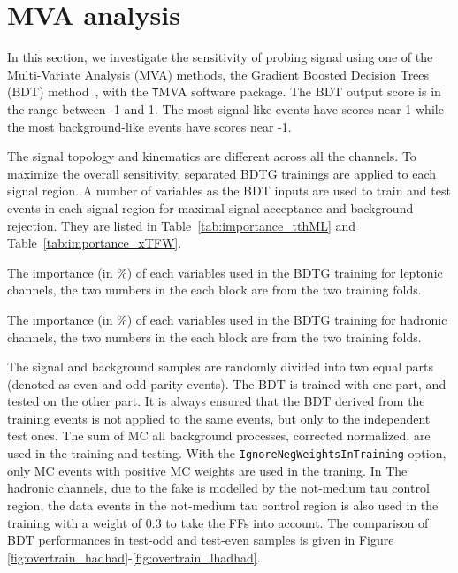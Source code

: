 \section{MVA analysis}
\label{sec:mva}

In this section, we investigate the sensitivity of probing signal using one of the Multi-Variate Analysis (MVA) methods, the Gradient Boosted Decision Trees (BDT) method~\cite{BDT,BDT2}, with the {\texttt TMVA} software package. The BDT output score is in the range between -1 and 1. The most signal-like events have scores near 1 while the most background-like events have scores near -1.

The signal topology and kinematics are different across all the channels. To maximize the overall sensitivity, separated BDTG trainings are applied to each signal region. A number of variables as the BDT inputs are used to train and test events in each signal region for maximal signal acceptance and background rejection. They are listed in Table~\ref{tab:importance_tthML} and Table~\ref{tab:importance_xTFW}. 

\begin{table}
\caption{The importance (in \%) of each variables used in the BDTG training for leptonic channels, the two numbers in the each block are from the two training folds.}
\label{tab:importance_tthML}
\begin{adjustbox}{center}

\end{adjustbox}
\end{table}


\begin{table}
\caption{The importance (in \%) of each variables used in the BDTG training for hadronic channels, the two numbers in the each block are from the two training folds.}
\label{tab:importance_xTFW}

\end{table}

The signal and background samples are randomly divided into two equal parts (denoted as even and odd parity events). The BDT is trained with one part, and tested on the other part. It is always ensured that the BDT derived from the training events is not applied to the same events, but only to the independent test ones. The sum of MC all background processes, corrected normalized, are used in the training and testing. %
With the \texttt{IgnoreNegWeightsInTraining} option, only MC events with positive MC weights are used in the traning. In The hadronic channels, due to the fake is modelled by the not-medium tau control region, the data events in the not-medium tau control region is also used in the training with a weight of 0.3 to take the FFs into account. The comparison of BDT performances in test-odd and test-even samples is given in Figure \ref{fig:overtrain_hadhad}-\ref{fig:overtrain_lhadhad}.

